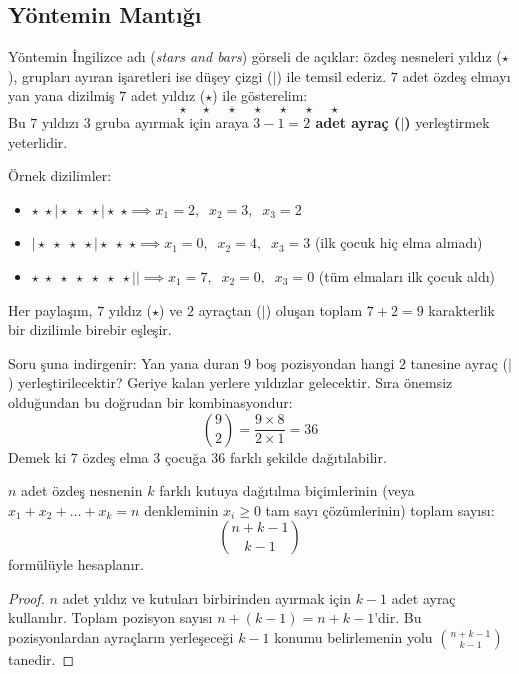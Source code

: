 \subsection{Yöntemin Mantığı}

Yöntemin İngilizce adı (\textit{stars and bars}) görseli de açıklar: özdeş nesneleri yıldız ($\star$), grupları ayıran işaretleri ise düşey çizgi ($|$) ile temsil ederiz. $7$ adet özdeş elmayı yan yana dizilmiş $7$ adet yıldız ($\star$) ile gösterelim:
\[ \star \quad \star \quad \star \quad \star \quad \star \quad \star \quad \star \]
Bu $7$ yıldızı $3$ gruba ayırmak için araya \textbf{$3 - 1 = 2$ adet ayraç ($|$)} yerleştirmek yeterlidir.

Örnek dizilimler:
\begin{itemize}
  \item $\star \; \star \mid \star \; \star \; \star \mid \star \; \star \implies x_1 = 2, \;\; x_2 = 3, \;\; x_3 = 2$
  \item $\mid \star \; \star \; \star \; \star \mid \star \; \star \; \star \implies x_1 = 0, \;\; x_2 = 4, \;\; x_3 = 3$ (ilk çocuk hiç elma almadı)
  \item $\star \; \star \; \star \; \star \; \star \; \star \; \star \mid \mid \implies x_1 = 7, \;\; x_2 = 0, \;\; x_3 = 0$ (tüm elmaları ilk çocuk aldı)
\end{itemize}

Her paylaşım, $7$ yıldız ($\star$) ve $2$ ayraçtan ($|$) oluşan toplam $7 + 2 = 9$ karakterlik bir dizilimle birebir eşleşir.

Soru şuna indirgenir: Yan yana duran $9$ boş pozisyondan hangi $2$ tanesine ayraç ($|$) yerleştirilecektir?
Geriye kalan yerlere yıldızlar gelecektir. Sıra önemsiz olduğundan bu doğrudan bir kombinasyondur:
\[ \binom{9}{2} = \frac{9 \times 8}{2 \times 1} = 36 \]
Demek ki $7$ özdeş elma $3$ çocuğa $36$ farklı şekilde dağıtılabilir.

\begin{theorem}
$n$ adet özdeş nesnenin $k$ farklı kutuya dağıtılma biçimlerinin (veya $x_1 + x_2 + \dots + x_k = n$ denkleminin $x_i \ge 0$ tam sayı çözümlerinin) toplam sayısı:
\[ \binom{n + k - 1}{k - 1} \]
formülüyle hesaplanır.
\end{theorem}
\begin{proof}
$n$ adet yıldız ve kutuları birbirinden ayırmak için $k - 1$ adet ayraç kullanılır. Toplam pozisyon sayısı $n + (k - 1) = n + k - 1$'dir. Bu pozisyonlardan ayraçların yerleşeceği $k - 1$ konumu belirlemenin yolu $\binom{n+k-1}{k-1}$ tanedir.
\end{proof}

